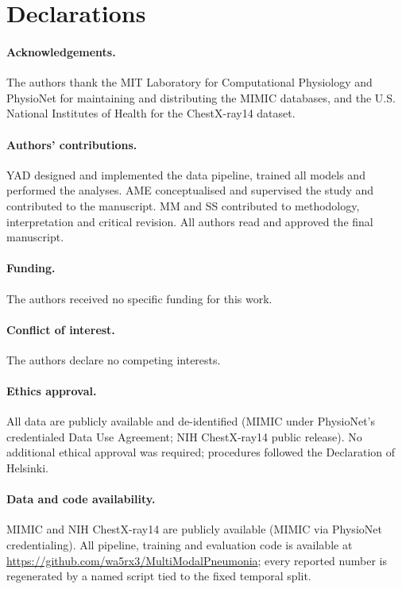 \documentclass[twocolumn, final]{svjour3}
\begin{document}
\section*{Declarations}
\paragraph{Acknowledgements.} The authors thank the MIT Laboratory for Computational
Physiology and PhysioNet for maintaining and distributing the MIMIC databases, and the
U.S. National Institutes of Health for the ChestX-ray14 dataset.
\paragraph{Authors' contributions.} YAD designed and implemented the data pipeline,
trained all models and performed the analyses. AME conceptualised and supervised the
study and contributed to the manuscript. MM and SS contributed to methodology,
interpretation and critical revision. All authors read and approved the final
manuscript.
\paragraph{Funding.} The authors received no specific funding for this work.
\paragraph{Conflict of interest.} The authors declare no competing interests.
\paragraph{Ethics approval.} All data are publicly available and de-identified (MIMIC
under PhysioNet's credentialed Data Use Agreement; NIH ChestX-ray14 public release).
No additional ethical approval was required; procedures followed the Declaration of
Helsinki.
\paragraph{Data and code availability.} MIMIC and NIH ChestX-ray14 are publicly
available (MIMIC via PhysioNet credentialing). All pipeline, training and evaluation
code is available at \url{https://github.com/wa5rx3/MultiModalPneumonia}; every
reported number is regenerated by a named script tied to the fixed temporal split.



\end{document}
